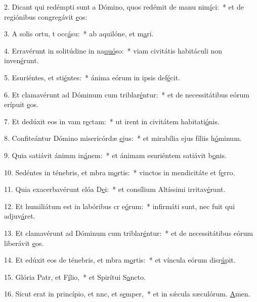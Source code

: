 2. Dicant qui redémpti sunt a Dómino, quos redémit de manu nim\uline{í}ci:~* et de regiónibus congregávit \uline{e}os:\par 
3. A solis ortu, t occ\uline{á}su:~* ab aquilóne, et m\uline{a}ri.\par 
4. Erravérunt in solitúdine in na\uline{quó}so:~* viam civitátis habitáculi non inven\uline{é}runt.\par 
5. Esuriéntes, et sti\uline{é}ntes:~* ánima eórum in ipsis def\uline{é}cit.\par 
6. Et clamavérunt ad Dóminum cum triblar\uline{é}ntur:~* et de necessitátibus eórum erípuit \uline{e}os.\par 
7. Et dedúxit eos in vam r\uline{e}ctam:~* ut irent in civitátem habitati\uline{ó}nis.\par 
8. Confiteántur Dómino misericórdæ \uline{e}jus:~* et mirabília ejus fíliis h\uline{ó}minum.\par 
9. Quia satiávit ánimm in\uline{á}nem:~* et ánimam esuriéntem satiávit b\uline{o}nis.\par 
10. Sedéntes in ténebris, et mbra m\uline{o}rtis:~* vinctos in mendicitáte et f\uline{e}rro.\par 
11. Quia exacerbavérunt elóa D\uline{e}i:~* et consílium Altíssimi irritav\uline{é}runt.\par 
12. Et humiliátum est in labóribus cr e\uline{ó}rum:~* infirmáti sunt, nec fuit qui adjuv\uline{á}ret.\par 
13. Et clamavérunt ad Dóminum cum triblar\uline{é}ntur:~* et de necessitátibus eórum liberávit \uline{e}os.\par 
14. Et edúxit eos de ténebris, et mbra m\uline{o}rtis:~* et víncula eórum disr\uline{ú}pit.\par 
15. Glória Patr, et F\uline{í}lio,~* et Spirítui S\uline{a}ncto.\par 
16. Sicut erat in princípio, et nnc, et s\uline{e}mper,~* et in sǽcula sæculórum. \uline{A}men.\par 
